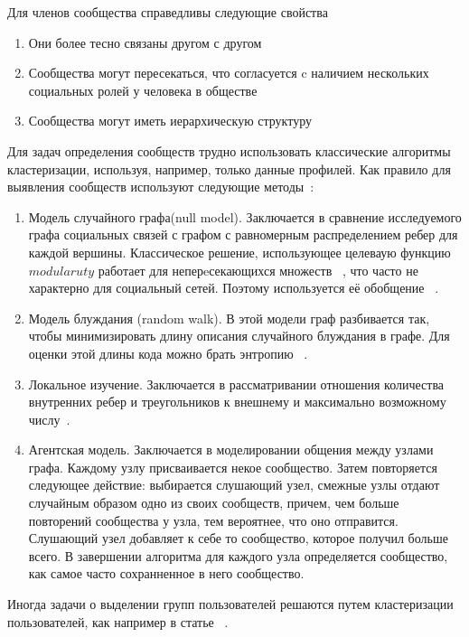 \documentclass[annotation,times,page4]{itmo-student-thesis}
\begin{document}
Для членов сообщества справедливы следующие свойства~\cite{nazar2012get}
\begin{enumerate}
\item Они более тесно связаны другом с другом
\item Сообщества могут пересекаться, что согласуется c наличием нескольких социальных ролей у человека в обществе
\item Сообщества могут иметь иерархическую структуру
\end{enumerate}

Для задач определения сообществ трудно использовать классические алгоритмы кластеризации, используя, например, только данные профилей.
Как правило для выявления сообществ используют следующие методы~\cite{nazar2012get}:
\begin{enumerate}
\item Модель случайного графа(null model). Заключается в сравнение исследуемого графа социальных связей с графом с равномерным распределением ребер для каждой вершины. Классическое решение, использующее целеваую функцию $modularuty$ работает для неперeсекающихся множеств ~\cite{newman2006finding}, что часто не характерно для социальный сетей. Поэтому используется её обобщение ~\cite{nicosia2008extending}.
\item Модель блуждания (random walk). В этой модели граф разбивается так, чтобы минимизировать длину описания случайного блуждания в графе. Для оценки этой длины кода можно брать энтропию ~\cite{rosvall2008maps}.
\item Локальное изучение. Заключается в рассматривании отношения количества внутренних ребер и треугольников к внешнему и максимально возможному числу~\cite{friggeri2011egomunities}.
\item Агентская модель. Заключается в моделировании общения между узлами графа. Каждому узлу присваивается некое сообщество. Затем повторяется следующее действие: выбирается слушающий узел, смежные узлы отдают случайным образом одно из своих сообществ, причем, чем больше повторений сообщества у узла, тем вероятнее, что оно отправится. Слушающий узел добавляет к себе то сообщество, которое получил больше всего. В завершении алгоритма для каждого узла определяется сообщество, как самое часто сохранненное в него сообщество.
\end{enumerate}

Иногда задачи о выделении групп пользователей решаются путем кластеризации пользователей, как например в статье ~\cite{barbera2015tweeting}.
\end{document}

